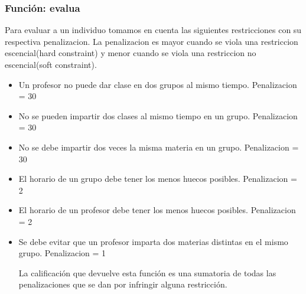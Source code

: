 \subsubsection{Funci\'on: evalua}

Para evaluar a un individuo tomamos en cuenta las siguientes restricciones con su respectiva penalizacion. La penalizacion es mayor cuando se viola una restriccion escencial(hard constraint) y menor cuando se viola una restriccion no escencial(soft constraint).

\begin{itemize}
	\item Un profesor no puede dar clase en dos grupos al mismo tiempo. Penalizacion = 30
	
	\item No se pueden impartir dos clases al mismo tiempo en un grupo. Penalizacion = 30
	
	\item No se debe impartir dos veces la misma materia en un grupo. Penalizacion = 30
	
	\item El horario de un grupo debe tener los menos huecos posibles. Penalizacion = 2
	
	\item El horario de un profesor debe tener los menos huecos posibles. Penalizacion = 2
	
	\item Se debe evitar que un profesor imparta dos materias distintas en el mismo grupo. Penalizacion = 1
	
	La calificación que devuelve esta función es una sumatoria de todas las penalizaciones que se dan por infringir alguna restricción.
	
\end{itemize}



